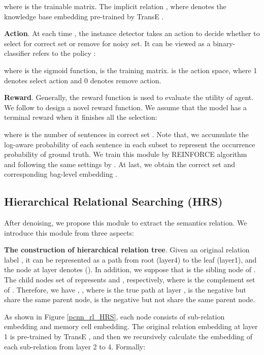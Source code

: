 \documentclass{article}
\begin{document}
where  is the trainable matrix. The implicit relation , where  denotes the knowledge base embedding pre-trained by TransE \cite{Fan2014Transition}.


\textbf{Action}. At each time , the instance detector takes an action to decide whether to select for correct set or remove for noisy set. It can be viewed as a binary-classifier refers to the policy :

where  is the sigmoid function,  is the training matrix.  is the action space, where 1 denotes select action and 0 denotes remove action.

\textbf{Reward}. Generally, the reward function is used to evaluate the utility of agent. We follow \cite{Feng2018Reinforcement} to design a novel reward function. We assume that the model has a terminal reward when it finishes all the selection:



where  is the number of sentences in correct set . Note that, we accumulate the log-aware probability of each sentence  in each subset to represent the occurrence probability of ground truth. We train this module by REINFORCE algorithm \cite{williams1992simple} and following the same settings by \cite{Feng2018Reinforcement}. At last, we obtain the correct set  and corresponding bag-level embedding .



\subsection{Hierarchical Relational Searching (HRS)}

After denoising, we propose this module to extract the semantics relation. We introduce this module from three aspects:

\textbf{The construction of hierarchical relation tree}. Given an original relation label , it can be represented as a path from root (layer4) to the leaf (layer1), and the node at layer  denotes  (). In addition, we suppose that  is the sibling node of . The child nodes set of  represents  and , respectively, where  is the complement set of . Therefore, we have , , where  is the true path at layer ,  is the negative but share the same parent node,  is the negative but not share the same parent node.

As shown in Figure \ref{pcnn_rl_HRS}, each node consists of sub-relation embedding and memory cell embedding. The original relation embedding at layer 1 is pre-trained by TransE \cite{Fan2014Transition}, and then we recursively calculate the embedding of each sub-relation from layer 2 to 4. Formally:
\end{document}

